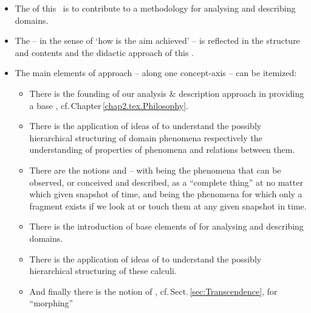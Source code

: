 \vspace*{-4mm}

\begin{itemize}
\item The  of this \monograph\ is to contribute to a 
      methodology for analysing and describing domains.
  
\item The  -- in the sense of `how is the aim
      achieved' -- is reflected in the structure and contents
      and the didactic approach of this \monograph.
\item The main elements of  approach -- along one
  concept-axis -- can be itemized: 
\begin{itemize}
\item There is the founding of our analysis \& description
      approach in providing a base ,
      cf.\,Chapter\,\ref{chap2.tex.Philosophy}. 
\item There is the application of ideas of  
      to understand the possibly hierarchical structuring
      of domain phenomena respectively the understanding of properties
      of phenomena and relations between them.
\item There {are} the notions  and  --
      with    being the phenomena
\begynd
\pind that can be observed, or conceived and described, as \nyl a ``complete
      thing'' at no matter which given snapshot of time,
\afslut
      and    being the phenomena 
\begynd
\pind for which only a fragment exists\pos{}{\\} if we look at or
      touch them\pos{}{\\} at
      any given snapshot in time.
\afslut
\item There is the introduction of base elements of
         for analysing and
      describing domains. 
\item There is the application of ideas of  
      to understand the possibly hierarchical structuring
      of these calculi. 
\item And finally there is the notion of
       , cf.\,Sect.\,\ref{sec:Transcendence}, for ``morphing''

\end{itemize}
\end{itemize}
